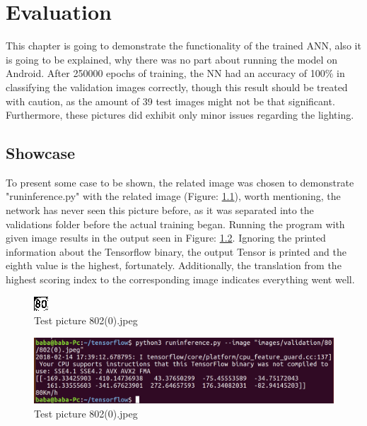 
\chapter{Evaluation}\label{chapter:Evaluation}
This chapter is going to demonstrate the functionality of the trained ANN, also it is going to be explained, why there was no part about running the model on Android. After 250000 epochs of training, the NN had an accuracy of 100\% in classifying the validation images correctly, though this result should be treated with caution, as the amount of 39 test images might not be that significant. Furthermore, these pictures did exhibit only minor issues regarding the lighting. 

\section{Showcase}\label{sec:showcase}
To present some case to be shown, the related image was chosen to demonstrate "runinference.py" with the related image (Figure: \ref{fig:802}), worth mentioning, the network has never seen this picture before, as it was separated into the validations folder before the actual training began. Running the program with given image results in the output seen in Figure: \ref{fig:programout}. Ignoring the printed information about the Tensorflow binary, the output Tensor is printed and the eighth value is the highest, fortunately. Additionally, the translation from the highest scoring index to the corresponding image indicates everything went well. 

\begin{figure}[H]
	\centering
	\includegraphics[width=0.4\linewidth]{images/802(0).jpeg}
	\caption{Test picture 802(0).jpeg}\label{fig:802}
\end{figure}


\begin{figure}[H]
	\centering
	\includegraphics[width=\linewidth]{images/program.png}
	\caption{Test picture 802(0).jpeg}\label{fig:programout}
\end{figure}


